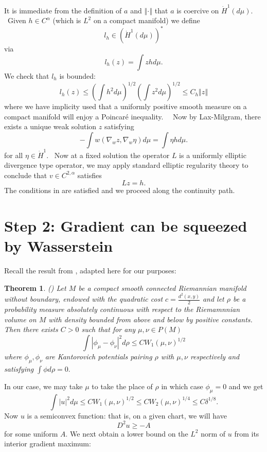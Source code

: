 \documentclass[11pt,letterpaper]{amsart}%
\newtheorem{theorem}{Theorem}
\numberwithin{equation}{section}
\begin{document}
It is immediate from the definition of $a$ and $\left\Vert \cdot\right\Vert $
that $a$ is coercive on $\dot{H}^{1}(d\mu).$ \ Given $h\in C^{\alpha}$ (which
is $L^{2}$ on a compact manifold) we define
\[
l_{h}\in\left(  \dot{H}^{1}(d\mu)\right)  ^{\ast}%
\]
via
\[
l_{h}(z)=\int zhd\mu.
\]
We check that $l_{h}$ is bounded:
\[
l_{h}(z)\leq\left(  \int h^{2}d\mu\right)  ^{1/2}\left(  \int z^{2}%
d\mu\right)  ^{1/2}\leq C_{h}\left\Vert z\right\Vert
\]
where we have implicity used that a uniformly positive smooth measure on a
compact manifold will enjoy a Poincar\'{e} inequality. \ \ Now by Lax-Milgram,
there exists a unique weak solution $z$ satisfying
\[
-\int w\left(  \nabla_{w}z,\nabla_{w}\eta\right)  d\mu=\int\eta hd\mu.
\]
for all $\eta\in\dot{H}^{1}.$ \ Now at a fixed solution the operator $L$ is a
uniformly elliptic divergence type operator, we may apply standard elliptic
regularity theory to conclude that $v\in C^{2,\alpha}$ satisfies
\[
Lz=h.
\]
The conditions in \cite[Theorem 17.6]{GT} are satisfied and we proceed along
the continuity path.

\section{Step 2: Gradient can be squeezed by Wasserstein}

Recall the result from \cite[Theorem 1.2 ]{KLM}, adapted here for our purposes:

\begin{theorem} (\cite{KLM})
Let $M$ be a compact smooth connected Riemannian manifold without boundary,
endowed with the quadratic cost $c=\frac{d^{2}(x,y)}{2}$ and let $\rho$ be a
probability measure absolutely continuous with respect to the Riemamnnian
volume on $M$ with density bounded from above and below by positive constants.
Then there exists $C>0$ such that for any $\mu,\nu\in P(M)$%
\[
\int\left\vert \phi_{\mu}-\phi_{\nu}\right\vert ^{2}d\rho\leq CW_{1}(\mu
,\nu)^{1/2}%
\]
where $\phi_{\mu},\phi_{\nu}$ are Kantorovich potentials pairing $\rho$ with
$\mu,\nu$ respectively and satisfying $\int\phi d\rho=0.$
\end{theorem}


In our case, we may take $\mu$ to take the place of $\rho$ in which case
$\phi_{\mu}=0$ and we get
\begin{equation}
\int\left\vert u\right\vert ^{2}d\mu  \leq CW_{1}(\mu,\nu)^{1/2}  \leq CW_{2}(\mu,\nu)^{1/4}  \leq C\delta^{1/8}. \label{preb}%
\end{equation}
Now $u$ is a semiconvex function: that is, on a given chart, we will
have
\[
D^{2}u\geq-A
\]
for some uniform $A.$ We next obtain  a lower bound on the $L^{2}$ norm of $u$ from its  interior
gradient maximum:
\end{document}
